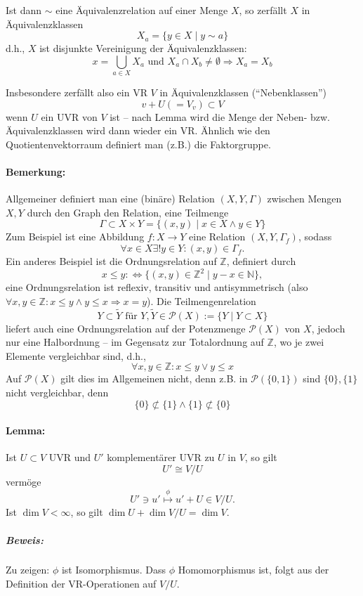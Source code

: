 	Ist dann $ \sim $ eine Äquivalenzrelation auf einer Menge $ X $, so zerfällt $ X $ in Äquivalenzklassen
		\[ X_a = \{y\in X\mid y\sim a\} \]
	d.h., $ X $ ist disjunkte Vereinigung der Äquivalenzklassen:
		\[ x = \bigcup_{a\in X}X_a \text{ und } X_a \cap X_b \neq \emptyset \Rightarrow X_a = X_b \]
		
	Insbesondere zerfällt also ein VR $ V $ in Äquivalenzklassen ("`Nebenklassen"')
		\[ v+U (= V_v)\subset V \]
	wenn $ U $ ein UVR von $ V $ ist -- nach Lemma wird die Menge der Neben- bzw. Äquivalenzklassen wird dann wieder ein VR. Ähnlich wie den Quotientenvektorraum definiert man (z.B.) die Faktorgruppe.
\paragraph{Bemerkung: }
	Allgemeiner definiert man eine (binäre) Relation $ (X,Y,\Gamma) $ zwischen Mengen $ X, Y $ durch den Graph den Relation, eine Teilmenge
		\[ \Gamma \subset X\times Y = \{(x,y)\mid x\in X \land y\in Y\} \]
	Zum Beispiel ist eine Abbildung $ f:X\to Y $ eine Relation $ (X,Y,\Gamma_f) $, sodass
		\[ \forall x\in X\exists ! y\in Y:(x,y)\in \Gamma_f. \]
	Ein anderes Beispiel ist die Ordnungsrelation auf $ \mathbb{Z} $, definiert durch
		\[ x\leq y :\Leftrightarrow \{(x,y)\in \mathbb{Z}^2\mid y-x\in \mathbb{N}\}, \]
	eine Ordnungsrelation ist reflexiv, transitiv und antisymmetrisch (also $ \forall x,y\in \mathbb{Z}: x\leq y\land y\leq x\Rightarrow x=y $).
	Die Teilmengenrelation
		\[ Y\subset\tilde{Y} \text{ für } Y,\tilde{Y}\in \mathcal{P}(X):= \{Y\mid Y\subset X\} \]
	liefert auch eine Ordnungsrelation auf der Potenzmenge $ \mathcal{P}(X) $ von $ X $, jedoch nur eine Halbordnung -- im Gegensatz zur Totalordnung auf $ \mathbb{Z} $, wo je zwei Elemente vergleichbar sind, d.h.,
		\[ \forall x,y\in \mathbb{Z}: x\leq y\lor y\leq x \]
	Auf $ \mathcal{P}(X) $ gilt dies im Allgemeinen nicht, denn z.B. in $ \mathcal{P}(\{0,1\}) $ sind $ \{0\},\{1\} $ nicht vergleichbar, denn
		\[ \{0\}\not\subset\{1\}\land \{1\}\not\subset \{0\} \]
		

\paragraph{Lemma: }
	Ist $ U\subset V $ UVR und $ U' $ komplementärer UVR zu $ U $ in $ V $, so gilt
		\[ U'\cong V/U \]
	vermöge
		\[ U'\ni u' \overset{\phi}{\mapsto} u'+U\in V/U. \]
	Ist $ \dim V<\infty $, so gilt $ \dim U+\dim V/U = \dim V $.
\subparagraph{Beweis: }
	Zu zeigen: $ \phi $ ist Isomorphismus. Dass $ \phi $ Homomorphismus ist, folgt aus der Definition der VR-Operationen auf $ V/U $.


